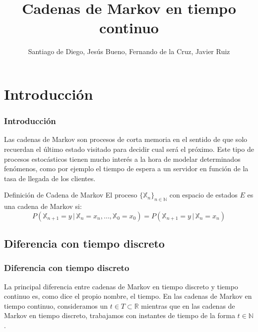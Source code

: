 \documentclass{beamer}
\title[CMTC]{Cadenas de Markov en tiempo continuo}
\author[Santiago,Jesus,Fernando]{Santiago de Diego, Jesús Bueno, Fernando de la Cruz, Javier Ruiz}
\date{}
\begin{document}
\frame{\titlepage}



\section{Introducción}
\begin{frame}
    \frametitle{Introducción}
     Las cadenas de Markov son procesos de corta memoria en el sentido de que solo recuerdan el último estado visitado para decidir cual será el próximo.
     \newline
     \newline
     Este tipo de procesos estocásticos tienen mucho interés a la hora de modelar determinados fenómenos, como por ejemplo el tiempo de espera a un servidor en función de la tasa de llegada de los clientes.
  \end{frame}
  \begin{frame}
       \begin{block}{Definición de Cadena de Markov}
  		 El proceso $\{\mathbb{X}_n \}_{n\in \mathbb{N}}$ con espacio de estados $E$ es una cadena de Markov si:
$$P(\mathbb{X}_{n+1}=y \, | \, \mathbb{X}_n = x_n , \ldots , \mathbb{X}_0 = x_0)=P(\mathbb{X}_{n+1}=y \, | \, {\mathbb{X}_n=x_n})$$
  		\end{block}
  	\end{frame}
\subsection{Diferencia con tiempo discreto}
\begin{frame}
\frametitle{Diferencia con tiempo discreto}
La principal diferencia entre cadenas de Markov en tiempo discreto y tiempo continuo es, como dice el propio nombre, el tiempo.
\newline
\newline
En las cadenas de Markov en tiempo continuo, consideramos un $t\in T \subset \mathbb{R}$ mientras que en las cadenas de Markov en tiempo discreto, trabajamos con instantes de tiempo de la forma $t\in \mathbb{N}$.
\end{frame}
\end{document}
